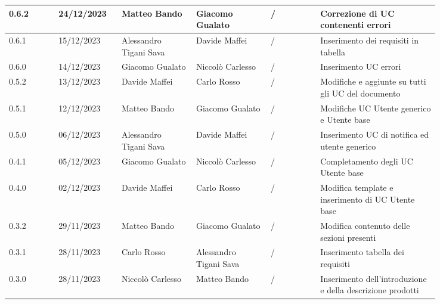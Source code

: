 {\begin{longtable}{p{0.10\linewidth}p{0.10\linewidth}p{0.15\linewidth}p{0.15\linewidth}p{0.10\linewidth}p{0.24\linewidth}}
	  \hline
	  0.6.2             & 24/12/2023    & Matteo Bando           & Giacomo Gualato        & /                      & Correzione di UC contenenti errori                                       \\
	  \hline
	  0.6.1             & 15/12/2023    & Alessandro Tigani Sava & Davide Maffei          & /                      & Inserimento dei requisiti in tabella                                     \\
	  \hline
	  0.6.0             & 14/12/2023    & Giacomo Gualato        & Niccolò Carlesso       & /                      & Inserimento UC errori                                                    \\
	  \hline
	  0.5.2             & 13/12/2023    & Davide Maffei          & Carlo Rosso            & /                      & Modifiche e aggiunte su tutti gli UC del documento                       \\
	  \hline
	  0.5.1             & 12/12/2023    & Matteo Bando           & Giacomo Gualato        & /                      & Modifiche UC Utente generico e Utente base                               \\
	  \hline
	  0.5.0             & 06/12/2023    & Alessandro Tigani Sava & Davide Maffei          & /                      & Inserimento UC di notifica ed utente generico                            \\
	  \hline
	  0.4.1             & 05/12/2023    & Giacomo Gualato        & Niccolò Carlesso       & /                      & Completamento degli UC Utente base                                       \\
	  \hline
	  0.4.0             & 02/12/2023    & Davide Maffei          & Carlo Rosso            & /                      & Modifica template e inserimento di UC Utente base                        \\
	  \hline
	  0.3.2             & 29/11/2023    & Matteo Bando           & Giacomo Gualato        & /                      & Modifica contenuto delle sezioni presenti                                \\
	  \hline
	  0.3.1             & 28/11/2023    & Carlo Rosso            & Alessandro Tigani Sava & /                      & Inserimento tabella dei requisiti                                        \\
	  \hline
	  0.3.0             & 28/11/2023    & Niccolò Carlesso       & Matteo Bando           & /                      & Inserimento dell'introduzione e della descrizione prodotti               \\

\end{longtable}}
